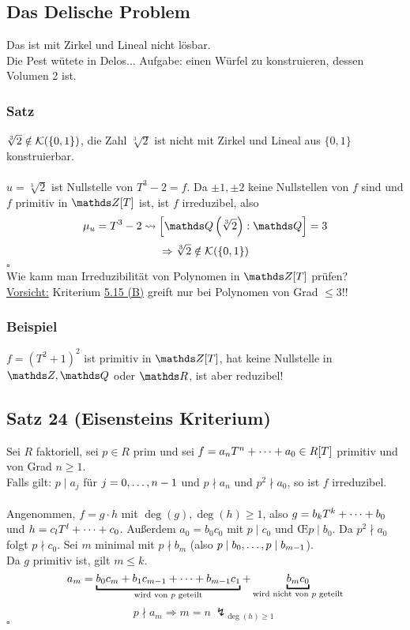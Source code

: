\subsection{Das Delische Problem}
\label{sub:delisches_problem}
Das  ist mit Zirkel und Lineal nicht lösbar.\\
Die Pest wütete in Delos... Aufgabe: einen Würfel zu konstruieren, dessen Volumen 2 ist.

\subsubsection*{Satz}
$\sqrt[3]{2}\notin \mathcal{K}(\{0,1\})$, die Zahl $\sqrt[3]{2}$ ist nicht mit Zirkel und Lineal aus $\{0,1\}$ konstruierbar.\\

\\
$u=\sqrt[3]{2}$ ist Nullstelle von $T^3-2=f$.
Da $\pm1,\pm2$ keine Nullstellen von $f$ sind und $f$ primitiv in $\Z[T]$ ist, ist $f$ irreduzibel, also
\[
\mu_u=T^3-2\rightsquigarrow \left[\Q\enbrace{\sqrt[3]{2}}:\Q\right]=3
\]
\[
\Rightarrow \sqrt[3]{2}\notin \mathcal{K}(\{0,1\})
\]
\hfill $\square$\\

Wie kann man Irreduzibilität von Polynomen in $\Z[T]$ prüfen?\\
\uline{Vorsicht:} Kriterium \hyperref[sub:bemerkung]{5.15 (B)} greift nur bei Polynomen von Grad $\le3$!!\\

\subsubsection*{Beispiel}
$f=(T^2+1)^2$ ist primitiv in $\Z[T]$, hat keine Nullstelle in $\Z,\Q$ oder $\R$, ist aber reduzibel!

\subsection{Satz 24 (Eisensteins Kriterium)}
\label{sub:satz_24}
Sei $R$ faktoriell, sei $p\in R$ prim und sei $f=a_nT^n+ \dots +a_0\in R[T]$ primitiv und von Grad $n\ge 1$.\\
Falls gilt: $p\mid a_j$ für $j=0, \dots ,n-1$ und $p\nmid a_n$ und $p^2\nmid a_0$, so ist $f$ irreduzibel.\\

\\
Angenommen, $f=g\cdot h$ mit $\deg(g),\deg(h)\ge 1$, also $g=b_kT^k+ \dots +b_0$ und $h=c_lT^l+ \dots +c_0$. 
Außerdem $a_0=b_0c_0$ mit $p\mid c_0$ und \OE $p\mid b_0$.
Da $p^2\nmid a_0$ folgt $p\nmid c_0$.
Sei $m$ minimal mit $p\nmid b_m$ (also $p\mid b_0, \dots ,p\mid b_{m-1}$).\\
Da $g$ primitiv ist, gilt $m\le k$.
\[
a_m=\underbracket{b_0c_m+b_1c_{m-1}\dt{+}b_{m-1}c_1}_{\text{wird von }p\text{ geteilt}}+\underbracket{b_mc_0}_{\text{wird nicht von }p \text{ geteilt}}
\]
\[
p\nmid a_m\Rightarrow m=n~\lightning_{\deg(h)\ge 1}
\]
\hfill $\square$\\

